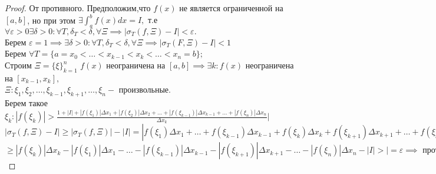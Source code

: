\documentclass[../main.tex]{subfiles}
\begin{document}
\begin{proof}
    От противного. Предположим,что $f(x)$ не является ограниченной на $[a,b]$, но при этом $\displaystyle \exists \int _{a}^{b} f(x)dx=I,\text{ т.е }$ $\forall \varepsilon >0 \exists \delta>0:\forall T,\delta_{T}<\delta, \forall \Xi\implies|\sigma_{T}(f,\Xi)-I|<\varepsilon.$\\
    Берем $\varepsilon=1\implies \exists \delta>0: \forall T,\delta_{T}<\delta,\forall \Xi \implies|\sigma_{T}(F,\Xi)-I|<1$\\
    Берем $\forall T=\{a=x_{0}<\dots<x_{k-1}<x_{k}<\dots<x_{n}=b\};$\\
    Строим $\Xi=\{\xi\}_{k=1}^{n}$
    $f(x)$ неограничена на $[a,b]\implies\exists k: f(x) $ неограничена на $[x_{k-1},x_{k}],$\\
    $\Xi: \xi_{1},\xi_{2},\dots,\xi_{k-1},\xi_{k+1},\dots,\xi_{n}-$ произвольные.\\
    Берем такое $\xi_{k}:|f(\xi_{k})|>\frac{1+|I|+|f(\xi_{1})|\Delta x_{1}+|f(\xi_{2})|\Delta x_{2} +\dots+|f(\xi_{k-1})|\Delta x_{k-1}+\dots+|f(\xi_{n})|\Delta x_{n}}{\Delta x_{k}}|$\\
    $|\sigma_{T}(f,\Xi)-I|\geqslant |\sigma_{T}(f,\Xi)|-|I|=|f(\xi_{1})\Delta x_{1}+\dots+ f(\xi_{k-1})\Delta x_{k-1}+f(\xi_{k})\Delta x_{k}+f(\xi_{k+1})\Delta x_{k+1}+\dots+f(\xi_{n})\Delta x_{n}|\allowbreak-|I|=|f(\xi_{k})\Delta x_{k}-(-f(\xi_{1})\Delta x_{1}-\dots-f(\xi_{k-1})\Delta x_{k-1}-f(\xi_{k+1})\Delta x_{k+1}-\dots-f(\xi_{n})\Delta x_{n})|-|I|\geqslant$
    \\$\geqslant |f(\xi_{k})|\Delta x_{k}-|f(\xi_{1})|\Delta x_{1}-\dots-|f(\xi_{k-1})|\Delta x_{k-1}-|f(\xi_{k+1})|\Delta x_{k+1}-\dots-|f(\xi_{n})|\Delta x_{n}-|I|>| = \varepsilon \implies \text{ противоречие}$ 
\end{proof}
\end{document}

